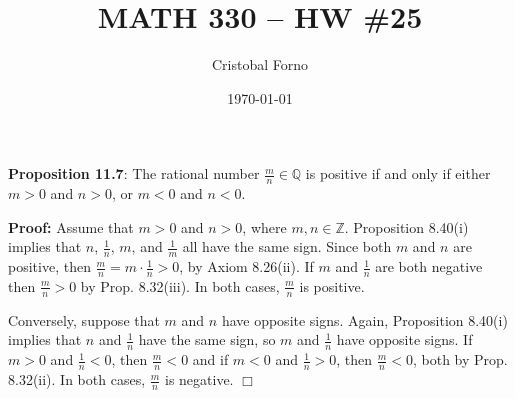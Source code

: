 \documentclass[12pt]{article}
\title{MATH 330 -- HW \#25}
\author{Cristobal Forno}
\date{\today}
\begin{document}
\maketitle

\textbf{Proposition 11.7}: The rational number $\frac{m}{n} \in \mathbb{Q}$ is
positive if and only if either $m > 0$ and $n > 0$, or $m < 0$ and $n < 0$.

\textbf{Proof:} Assume that $m > 0$ and $n > 0$, where $m, n \in \mathbb{Z}$.
Proposition 8.40(i) implies that $n$, $\frac{1}{n}$, $m$, and $\frac{1}{m}$ all
have the same sign. Since both $m$ and $n$ are positive, then $\frac{m}{n} = m \cdot
\frac{1}{n} > 0$, by Axiom 8.26(ii). If $m$ and $\frac{1}{n}$ are both negative
then $\frac{m}{n} > 0$ by Prop. 8.32(iii). In both cases, $\frac{m}{n}$ is positive.

Conversely, suppose that $m$ and $n$ have opposite signs. Again, Proposition
8.40(i) implies that $n$ and $\frac{1}{n}$ have the same sign, so $m$ and
$\frac{1}{n}$ have opposite signs. If $m > 0$ and $\frac{1}{n} < 0$, then
$\frac{m}{n} < 0$ and if $m < 0$ and $\frac{1}{n} > 0$, then $\frac{m}{n} < 0$,
both by Prop. 8.32(ii). In both cases, $\frac{m}{n}$ is negative. $\Box$
\end{document}

